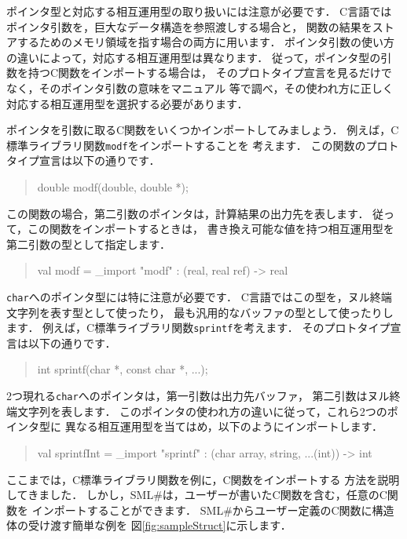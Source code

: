 \documentclass{jbook}
\newcommand{\smlsharp}{SML\#}
\newenvironment{program}{\begin{quote}\begin{tt}}%
                        {\end{tt}\end{quote}}
\begin{document}
	ポインタ型と対応する相互運用型の取り扱いには注意が必要です．
	C言語ではポインタ引数を，巨大なデータ構造を参照渡しする場合と，
関数の結果をストアするためのメモリ領域を指す場合の両方に用います．
	ポインタ引数の使い方の違いによって，対応する相互運用型は異なります．
	従って，ポインタ型の引数を持つC関数をインポートする場合は，
そのプロトタイプ宣言を見るだけでなく，そのポインタ引数の意味をマニュアル
等で調べ，その使われ方に正しく対応する相互運用型を選択する必要があります．

	ポインタを引数に取るC関数をいくつかインポートしてみましょう．
	例えば，C標準ライブラリ関数{\tt modf}をインポートすることを
考えます．
	この関数のプロトタイプ宣言は以下の通りです．
\begin{program}
double modf(double, double *);
\end{program}
	この関数の場合，第二引数のポインタは，計算結果の出力先を表します．
	従って，この関数をインポートするときは，
書き換え可能な値を持つ相互運用型を第二引数の型として指定します．
\begin{program}
val modf = \_import "modf" : (real, real ref) -> real
\end{program}
	{\tt char}へのポインタ型には特に注意が必要です．
	C言語ではこの型を，ヌル終端文字列を表す型として使ったり，
最も汎用的なバッファの型として使ったりします．
	例えば，C標準ライブラリ関数{\tt sprintf}を考えます．
	そのプロトタイプ宣言は以下の通りです．
\begin{program}
int sprintf(char *, const char *, ...);
\end{program}
	2つ現れる{\tt char}へのポインタは，第一引数は出力先バッファ，
第二引数はヌル終端文字列を表します．
	このポインタの使われ方の違いに従って，これら2つのポインタ型に
異なる相互運用型を当てはめ，以下のようにインポートします．
\begin{program}
val sprintfInt = \_import "sprintf" : (char array, string, ...(int)) -> int
\end{program}

	ここまでは，C標準ライブラリ関数を例に，C関数をインポートする
方法を説明してきました．
	しかし，\smlsharp{}は，ユーザーが書いたC関数を含む，任意のC関数を
インポートすることができます．
	\smlsharp{}からユーザー定義のC関数に構造体の受け渡す簡単な例を
図\ref{fig:sampleStruct}に示します．
\end{document}
